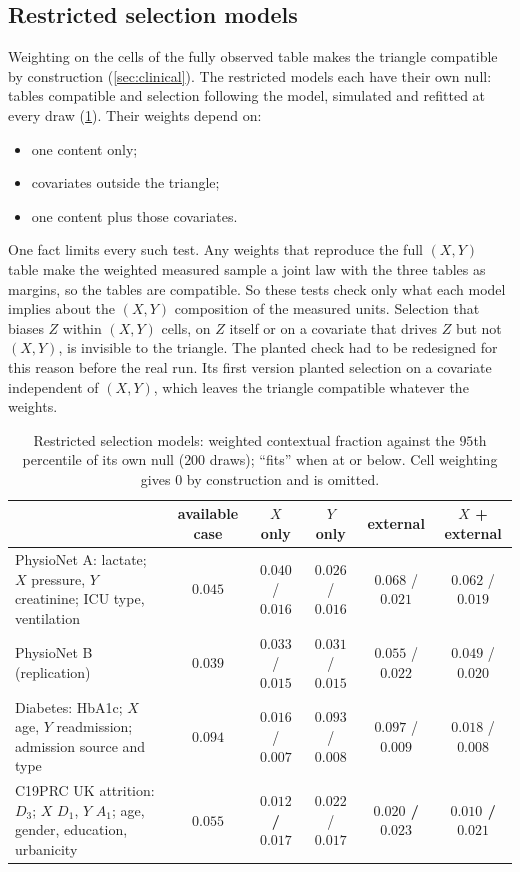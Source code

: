 \documentclass[11pt]{article}
\theoremstyle{definition}
\theoremstyle{remark}
\begin{document}
\subsection{Restricted selection models}\label{sec:restricted}

Weighting on the cells of the fully observed table makes the triangle compatible by construction (\cref{sec:clinical}). The
restricted models each have their own null: tables compatible and selection following the model, simulated and refitted at every draw
(\cref{tab:restricted}). Their weights depend on:
\begin{itemize}[leftmargin=*,nosep]
\item one content only;
\item covariates outside the triangle;
\item one content plus those covariates.
\end{itemize}
One fact limits every such test. Any weights that reproduce the full $(X,Y)$ table make the weighted measured sample a joint law with the
three tables as margins, so the tables are compatible. So these tests check only what each model implies about the $(X,Y)$ composition of
the measured units. Selection that biases $Z$ within $(X,Y)$ cells, on $Z$ itself or on a covariate that drives $Z$ but not $(X,Y)$, is
invisible to the triangle. The planted check had to be redesigned for this reason before the real run. Its first version planted
selection on a covariate independent of $(X,Y)$, which leaves the triangle compatible whatever the weights.

\begin{table}[!htbp]
\centering\footnotesize
\caption{Restricted selection models: weighted contextual fraction against the $95$th percentile of its own null ($200$ draws);
``fits'' when at or below. Cell weighting gives $0$ by construction and is omitted.}\label{tab:restricted}
\setlength{\tabcolsep}{3pt}
\begin{tabular}{>{\raggedright}p{5.0cm}ccccc}
\toprule
 & available case & $X$ only & $Y$ only & external & $X$ + external\\
\midrule
PhysioNet A: lactate; $X$ pressure, $Y$ creatinine; ICU type, ventilation & $0.045$ & $0.040$ / $0.016$ & $0.026$ / $0.016$ & $0.068$ / $0.021$ & $0.062$ / $0.019$\\
PhysioNet B (replication) & $0.039$ & $0.033$ / $0.015$ & $0.031$ / $0.015$ & $0.055$ / $0.022$ & $0.049$ / $0.020$\\
Diabetes: HbA1c; $X$ age, $Y$ readmission; admission source and type & $0.094$ & $0.016$ / $0.007$ & $0.093$ / $0.008$ & $0.097$ / $0.009$ & $0.018$ / $0.008$\\
C19PRC UK attrition: $D_3$; $X$ $D_1$, $Y$ $A_1$; age, gender, education, urbanicity & $0.055$ & \textbf{$0.012$ / $0.017$} & $0.022$ / $0.017$ & \textbf{$0.020$ / $0.023$} & \textbf{$0.010$ / $0.021$}\\
\bottomrule
\end{tabular}
\end{table}
\end{document}
